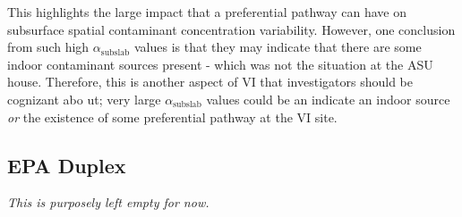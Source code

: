 This highlights the large impact that a preferential pathway can have on subsurface spatial contaminant concentration variability.
However, one conclusion from such high $\alpha_\mathrm{subslab}$ values is that they may indicate that there are some indoor contaminant sources present - which was not the situation at the ASU house.
Therefore, this is another aspect of VI that investigators should be cognizant abo ut; very large $\alpha_\mathrm{subslab}$ values could be an indicate an indoor source \textit{or} the existence of some preferential pathway at the VI site.\par

\subsection{EPA Duplex}

\textit{This is purposely left empty for now.}
